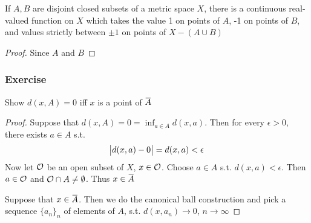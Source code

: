 \documentclass[11pt]{article}
\begin{document}
\begin{lemma}[]
If \(A,B\) are disjoint closed subsets of a metric space \(X\), there is a
continuous real-valued function on \(X\) which takes the value 1 on points of
\(A\), -1 on points of \(B\), and values strictly between \(\pm1\) on points
of \(X-(A\cup B)\)
\end{lemma}

\begin{proof}
Since \(A\) and \(B\)
\end{proof}
















\subsubsection{Exercise}
\label{sec:orgfbe928e}
\begin{exercise}
\label{ex2.4.27}
Show \(d(x,A)=0\) iff \(x\) is a point of \(\bbar{A}\)
\end{exercise}

\begin{proof}
Suppose that \(d(x,A)=0=\inf_{a\in A}d(x,a)\). Then for every \(\epsilon>0\), there
exists \(a\in A\) s.t.
\begin{equation*}
\abs{d(x,a)-0}=d(x,a)<\epsilon
\end{equation*}
Now let \(\mathcal{O}\) be an open subset of \(X\), \(x\in\mathcal{O}\). Choose \(a\in
    A\) s.t. \(d(x,a)<\epsilon\). Then \(a\in\mathcal{O}\) and \(\mathcal{O}\cap
    A\neq\emptyset\). Thus \(x\in\bbar{A}\)

Suppose that \(x\in\bbar{A}\). Then we do the canonical ball construction
and pick a sequence \(\{a_n\}_n\) of elements of \(A\), s.t.
\(d(x,a_n)\to0\), \(n\to\infty\)
\end{proof}
\end{document}

